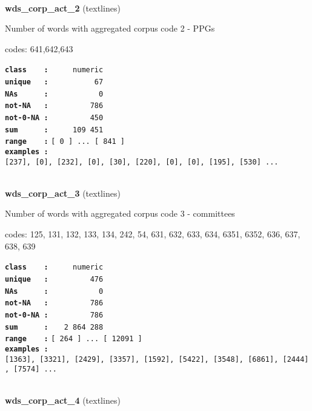 \documentclass[]{article}
\begin{document}
~

\textbf{wds\_corp\_act\_2} (textlines)

Number of words with aggregated corpus code 2 - PPGs

codes: 641,642,643

\textbf{\texttt{class\ \ \ \ :}} \texttt{~~~~~numeric}\\
\textbf{\texttt{unique\ \ \ :}} \texttt{~~~~~~~~~~67}\\
\textbf{\texttt{NAs\ \ \ \ \ \ :}} \texttt{~~~~~~~~~~~0}\\
\textbf{\texttt{not-NA\ \ \ :}} \texttt{~~~~~~~~~786}\\
\textbf{\texttt{not-0-NA\ :}} \texttt{~~~~~~~~~450}\\
\textbf{\texttt{sum\ \ \ \ \ \ :}} \texttt{~~~~~109~451}\\
\textbf{\texttt{range\ \ \ \ :}}
\texttt{{[}\ 0\ {]}\ ...\ {[}\ 841\ {]}}\\
\textbf{\texttt{examples\ :}}
\texttt{{[}237{]},\ {[}0{]},\ {[}232{]},\ {[}0{]},\ {[}30{]},\ {[}220{]},\ {[}0{]},\ {[}0{]},\ {[}195{]},\ {[}530{]}\ ...}\\

~

\textbf{wds\_corp\_act\_3} (textlines)

Number of words with aggregated corpus code 3 - committees

codes: 125, 131, 132, 133, 134, 242, 54, 631, 632, 633, 634, 6351, 6352,
636, 637, 638, 639

\textbf{\texttt{class\ \ \ \ :}} \texttt{~~~~~numeric}\\
\textbf{\texttt{unique\ \ \ :}} \texttt{~~~~~~~~~476}\\
\textbf{\texttt{NAs\ \ \ \ \ \ :}} \texttt{~~~~~~~~~~~0}\\
\textbf{\texttt{not-NA\ \ \ :}} \texttt{~~~~~~~~~786}\\
\textbf{\texttt{not-0-NA\ :}} \texttt{~~~~~~~~~786}\\
\textbf{\texttt{sum\ \ \ \ \ \ :}} \texttt{~~~2~864~288}\\
\textbf{\texttt{range\ \ \ \ :}}
\texttt{{[}\ 264\ {]}\ ...\ {[}\ 12091\ {]}}\\
\textbf{\texttt{examples\ :}}
\texttt{{[}1363{]},\ {[}3321{]},\ {[}2429{]},\ {[}3357{]},\ {[}1592{]},\ {[}5422{]},\ {[}3548{]},\ {[}6861{]},\ {[}2444{]},\ {[}7574{]}\ ...}\\

~

\textbf{wds\_corp\_act\_4} (textlines)
\end{document}
